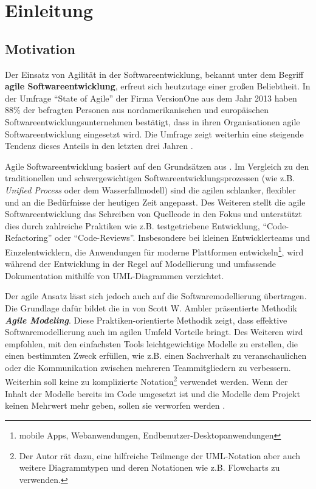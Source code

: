 
\chapter{Einleitung}
\label{chapter:introduction}

\section{Motivation}

Der Einsatz von Agilität in der Softwareentwicklung, bekannt unter dem Begriff \textbf{agile Softwareentwicklung}, erfreut sich heutzutage einer großen Beliebtheit. In der Umfrage \enquote{State of Agile} der Firma VersionOne aus dem Jahr 2013 haben 88\% der befragten Personen aus nordamerikanischen und europäischen Softwareentwicklungsunternehmen bestätigt, dass in ihren Organisationen agile Softwareentwicklung eingesetzt wird. Die Umfrage zeigt weiterhin eine steigende Tendenz dieses Anteils in den letzten drei Jahren \cite{VersionOne148th-Annual}.

Agile Softwareentwicklung basiert auf den Grundsätzen aus \cite{BeckBeedle01Manifest}. Im Vergleich zu den traditionellen und schwergewichtigen Softwareentwicklungsprozessen (wie z.B. \textit{Unified Process} oder dem Wasserfallmodell) sind die agilen schlanker, flexibler und an die Bedürfnisse der heutigen Zeit angepasst. Des Weiteren stellt die agile Softwareentwicklung das Schreiben von Quellcode in den Fokus und unterstützt dies durch zahlreiche Praktiken wie z.B. testgetriebene Entwicklung, \enquote{Code-Refactoring} oder \enquote{Code-Reviews}. Insbesondere bei kleinen Entwicklerteams und Einzelentwicklern, die Anwendungen für moderne Plattformen entwickeln\footnote{mobile Apps, Webanwendungen, Endbenutzer-Desktopanwendungen}, wird während der Entwicklung in der Regel auf Modellierung und umfassende Dokumentation mithilfe von UML-Dia\-gram\-men verzichtet.

Der agile Ansatz lässt sich jedoch auch auf die Softwaremodellierung übertragen. Die Grundlage dafür bildet die in \cite{Ambler02Agile} von Scott W. Ambler präsentierte Methodik \textbf{\textit{Agile Modeling}}. Diese Praktiken-orientierte Methodik zeigt, dass effektive Softwaremodellierung auch im agilen Umfeld Vorteile bringt. Des Weiteren wird empfohlen, mit den einfachsten Tools leichtgewichtige Modelle zu erstellen, die einen bestimmten Zweck erfüllen, wie z.B. einen Sachverhalt zu veranschaulichen oder die Kommunikation zwischen mehreren Teammitgliedern zu verbessern. Weiterhin soll keine zu komplizierte Notation\footnote{Der Autor rät dazu, eine hilfreiche Teilmenge der UML-Notation aber auch weitere Diagrammtypen und deren Notationen wie z.B. Flowcharts zu verwenden.} verwendet werden. Wenn der Inhalt der Modelle bereits im Code umgesetzt ist und die Modelle dem Projekt keinen Mehrwert mehr geben, sollen sie verworfen werden \cite{Ambler02Agile}.

